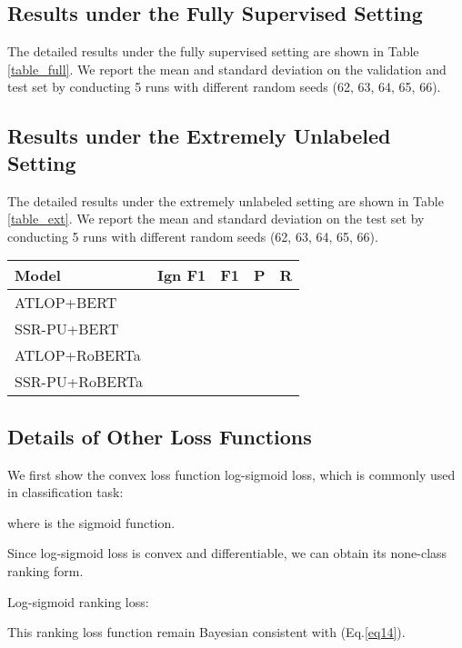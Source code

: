 \documentclass[11pt]{article}
\begin{document}
\subsection{Results under the Fully Supervised Setting}
\label{c2}

The detailed results under the fully supervised setting are shown in Table \ref{table_full}. We report the mean and standard deviation on the validation and test set by conducting 5 runs with different random seeds (62, 63, 64, 65, 66).

\subsection{Results under the Extremely Unlabeled Setting}
\label{c3}

The detailed results under the extremely unlabeled setting are shown in Table \ref{table_ext}. We report the mean and standard deviation on the test set by conducting 5 runs with different random seeds (62, 63, 64, 65, 66).

\begin{table*}
\centering
\begin{tabular}{lcccc}
\hline \textbf{Model} & \textbf{Ign F1} & \textbf{F1} & \textbf{P} & \textbf{R} \\
\hline ATLOP+BERT &  &  &  &  \\
SSR-PU+BERT &  &  &  &  \\
\hline ATLOP+RoBERTa &  &  &  &  \\
SSR-PU+RoBERTa &  &  &  &  \\
\hline
\end{tabular}
\caption{\label{table_ext}
Results on Re-DocRED revised test set under the extremely unlabeled setting. Results with  are based on our implementation.
}
\end{table*}

\subsection{Details of Other Loss Functions}
\label{appendix5}
We first show the convex loss function log-sigmoid loss, which is commonly used in classification task:


where  is the sigmoid function.

Since log-sigmoid loss is convex and differentiable, we can obtain its none-class ranking form.

Log-sigmoid ranking loss:


This ranking loss function remain Bayesian consistent with  (Eq.\ref{eq14}).
\end{document}

